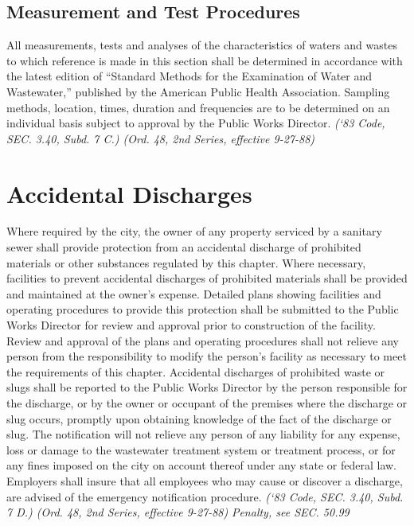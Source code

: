 \documentclass[code.tex]{subfiles}
\begin{document}
\subsection{Measurement and Test Procedures}
All measurements, tests and analyses of the characteristics of waters and wastes to which reference is made in this section shall be determined in accordance with the latest edition of “Standard Methods for the Examination of Water and Wastewater,” published by the American Public Health Association.  Sampling methods, location, times, duration and frequencies are to be determined on an individual basis subject to approval by the Public Works Director.\newline
\emph{(‘83 Code, SEC. 3.40, Subd. 7 C.) (Ord. 48, 2nd Series, effective 9-27-88)}
\section{Accidental Discharges}
Where required by the city, the owner of any property serviced by a sanitary sewer shall provide protection from an accidental discharge of prohibited materials or other substances regulated by this chapter.  Where necessary, facilities to prevent accidental discharges of prohibited materials shall be provided and maintained at the owner’s expense.  Detailed plans showing facilities and operating procedures to provide this protection shall be submitted to the Public Works Director for review and approval prior to construction of the facility.  Review and approval of the plans and operating procedures shall not relieve any person from the responsibility to modify the person’s facility as necessary to meet the requirements of this chapter.  Accidental discharges of prohibited waste or slugs shall be reported to the Public Works Director by the person responsible for the discharge, or by the owner or occupant of the premises where the discharge or slug occurs, promptly upon obtaining knowledge of the fact of the discharge or slug.  The notification will not relieve any person of any liability for any expense, loss or damage to the wastewater treatment system or treatment process, or for any fines imposed on the city on account thereof under any state or federal law.  Employers shall insure that all employees who may cause or discover a discharge, are advised of the emergency notification procedure.\newline
\emph{(‘83 Code, SEC. 3.40, Subd. 7 D.) (Ord. 48, 2nd Series, effective 9-27-88)}\newline
\emph{Penalty, see SEC. 50.99}
\end{document}
